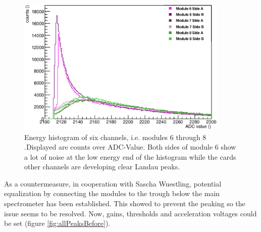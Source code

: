   \begin{figure}
   \centering
   \includegraphics[width=0.9\textwidth]{graphics/setup/histogramNoise.eps}
   \caption[Six channel energy histogram with noise]{Energy histogram of six channels, i.e. modules 6 through 8 .Displayed are counts over ADC-Value. Both sides of module 6 show a lot of noise at the low energy end of the histogram while the cards other channels are developing clear Landau peaks.}
  \end{figure}
  
  As a countermeasure, in cooperation with Sascha Wuestling, potential equalization by connecting the modules to the trough below the main spectrometer has been established. This showed to prevent the peaking so the issue seems to be resolved. Now, gains, thresholds and acceleration voltages could be set (figure \ref{fig:allPeaksBefore}).
  
